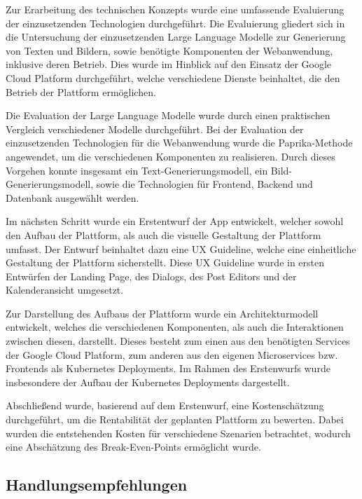 Zur Erarbeitung des technischen Konzepts wurde eine umfassende Evaluierung der einzusetzenden Technologien durchgeführt.
Die Evaluierung gliedert sich in die Untersuchung der einzusetzenden Large Language Modelle zur Generierung von Texten und Bildern, sowie benötigte Komponenten der Webanwendung, inklusive deren Betrieb.
Dies wurde im Hinblick auf den Einsatz der Google Cloud Platform durchgeführt, welche verschiedene Dienste beinhaltet, die den Betrieb der Plattform ermöglichen.

Die Evaluation der Large Language Modelle wurde durch einen praktischen Vergleich verschiedener Modelle durchgeführt.
Bei der Evaluation der einzusetzenden Technologien für die Webanwendung wurde die Paprika-Methode angewendet, um die verschiedenen Komponenten zu realisieren.
Durch dieses Vorgehen konnte insgesamt ein Text-Generierungsmodell, ein Bild-Generierungsmodell, sowie die Technologien für Frontend, Backend und Datenbank ausgewählt werden.

Im nächsten Schritt wurde ein Erstentwurf der App entwickelt, welcher sowohl den Aufbau der Plattform, als auch die visuelle Gestaltung der Plattform umfasst.
Der Entwurf beinhaltet dazu eine \ac{UX} Guideline, welche eine einheitliche Gestaltung der Plattform sicherstellt.
Diese \ac{UX} Guideline wurde in ersten Entwürfen der Landing Page, des Dialogs, des Post Editors und der Kalenderansicht umgesetzt.

Zur Darstellung des Aufbaus der Plattform wurde ein Architekturmodell entwickelt, welches die verschiedenen Komponenten, als auch die Interaktionen zwischen diesen, darstellt.
Dieses besteht zum einen aus den benötigten Services der Google Cloud Platform, zum anderen aus den eigenen Microservices bzw. Frontends als Kubernetes Deployments.
Im Rahmen des Erstenwurfs wurde insbesondere der Aufbau der Kubernetes Deployments dargestellt.

Abschließend wurde, basierend auf dem Erstenwurf, eine Kostenschätzung durchgeführt, um die Rentabilität der geplanten Plattform zu bewerten.
Dabei wurden die entstehenden Kosten für verschiedene Szenarien betrachtet, wodurch eine Abschätzung des Break-Even-Points ermöglicht wurde.

\subsection{Handlungsempfehlungen}

